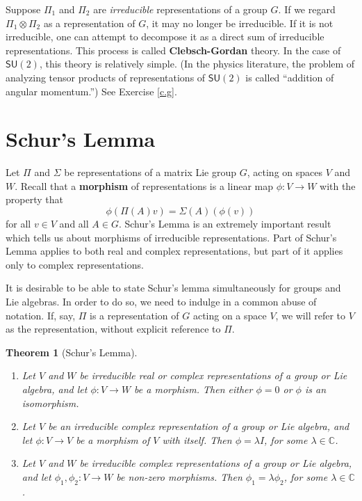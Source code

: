 \documentclass{amsbook}
\theoremstyle{plain}
\newtheorem{theorem}{Theorem}
\numberwithin{equation}{chapter}
\numberwithin{theorem}{chapter}
\begin{document}
Suppose $\Pi_{1}$ and $\Pi_{2}$ are \textit{irreducible} representations of a
group $G$. If we regard $\Pi_{1}\otimes\Pi_{2}$ as a representation of $G$, it
may no longer be irreducible. If it is not irreducible, one can attempt to
decompose it as a direct sum of irreducible representations. This process is
called \textbf{Clebsch-Gordan} theory. In the case of $\mathsf{SU}(2)$, this
theory is relatively simple. (In the physics literature, the problem of
analyzing tensor products of representations of $\mathsf{SU}(2)$ is called
``addition of angular momentum.'') See Exercise \ref{c.g}.

\section{Schur's Lemma}

Let $\Pi$ and $\Sigma$ be representations of a matrix Lie group $G$, acting on
spaces $V$ and $W$. Recall that a \textbf{morphism} of representations is a
linear map $\phi:V\rightarrow W$ with the property that
\[
\phi\left(  \Pi(A)v\right)  =\Sigma(A)\left(  \phi(v)\right)
\]
for all $v\in V$ and all $A\in G$. Schur's Lemma is an extremely important
result which tells us about morphisms of irreducible representations. Part of
Schur's Lemma applies to both real and complex representations, but part of it
applies only to complex representations.

It is desirable to be able to state Schur's lemma simultaneously for groups
and Lie algebras. In order to do so, we need to indulge in a common abuse of
notation. If, say, $\Pi$ is a representation of $G$ acting on a space $V$, we
will refer to $V$ as the representation, without explicit reference to $\Pi$.

\begin{theorem}
[Schur's Lemma]%
\begin{enumerate}
\item \label{schur1}Let $V$ and $W$ be \textit{irreducible} real or complex
representations of a group or Lie algebra, and let $\phi:V\rightarrow W$ be a
morphism. Then either $\phi=0$ or $\phi$ is an isomorphism.

\item \label{schur2}Let $V$ be an irreducible \textit{complex} representation
of a group or Lie algebra, and let $\phi:V\rightarrow V$ be a morphism of $V$
with itself. Then $\phi=\lambda I$, for some $\lambda\in\mathbb{C}$.

\item \label{schur3}Let $V$ and $W$ be irreducible complex representations of
a group or Lie algebra, and let $\phi_{1},\phi_{2}:V\rightarrow W$ be non-zero
morphisms. Then $\phi_{1}=\lambda\phi_{2}$, for some $\lambda\in\mathbb{C}$.
\end{enumerate}
\end{theorem}
\end{document}
